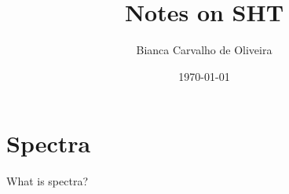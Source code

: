 \documentclass[a4paper,english,11pt]{article}
\title{Notes on SHT}
\author{Bianca Carvalho de Oliveira}
\date{\today}
\theoremstyle{definition}
\theoremstyle{plain}
\theoremstyle{remark}
\begin{document}
\maketitle
\section{Spectra}
What is spectra?
\end{document}
